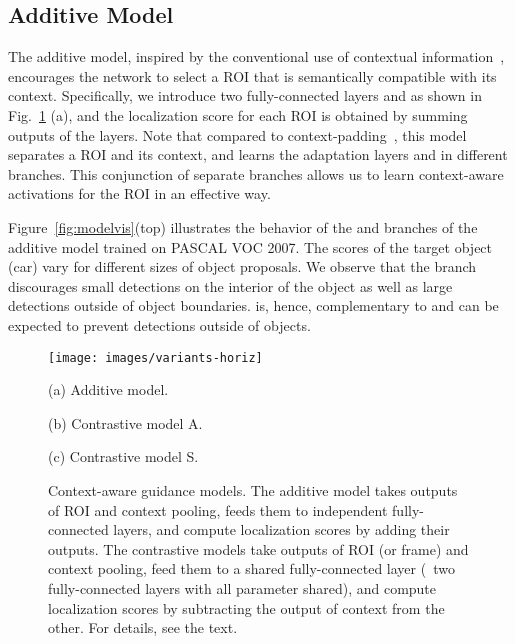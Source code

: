 \documentclass[runningheads]{llncs}
\begin{document}
\subsection{Additive Model} \label{sec:additive}



The additive model, inspired by the conventional use of contextual
information~\cite{Oliva:2007ui,Rabinovich:2007wy,Felzenszwalb:2009wx,Girshick:2016ig,Gidaris:2015cx},
encourages the network to select a ROI that is semantically compatible with its context. 
Specifically, we introduce two fully-connected layers  and  as shown in Fig.~\ref{fig:models} (a), and the localization score for each ROI is obtained by summing outputs of the layers. Note that compared to context-padding~\cite{Girshick:2016ig}, 
this model separates a ROI and its
context, and learns the adaptation layers  and  in different branches. This conjunction of separate
branches allows us to learn context-aware activations for the ROI in an
effective way. 

Figure~\ref{fig:modelvis}(top) illustrates the behavior of the  and 
branches of the additive model trained on PASCAL VOC 2007. The scores of
the target object (car) vary for different sizes of object proposals.
We observe that the  branch discourages small detections on the
interior of the object as well as large detections outside of object boundaries.
 is, hence, complementary to  and can be expected to prevent detections
outside of objects.







\begin{figure}[t] \texttt{[image: images/variants-horiz]} \begin{minipage}{0.32\linewidth} \centering
\small{(a) Additive model. } \end{minipage} \begin{minipage}{0.32\linewidth}
\centering \small{(b) Contrastive model A. } \end{minipage}
\begin{minipage}{0.32\linewidth} \centering \small{(c) Contrastive model S. }
\end{minipage}
\caption[small]{Context-aware guidance models.
The additive model takes outputs of ROI and context pooling, feeds them to independent fully-connected layers, and compute localization scores by adding their outputs.  
The contrastive models take outputs of ROI (or frame) and context pooling, feed them to a shared fully-connected layer (\ie~two fully-connected layers with all parameter shared), and compute localization scores by subtracting the output of context from the other. For details, see the text.}
\label{fig:models} \end{figure}
\end{document}
